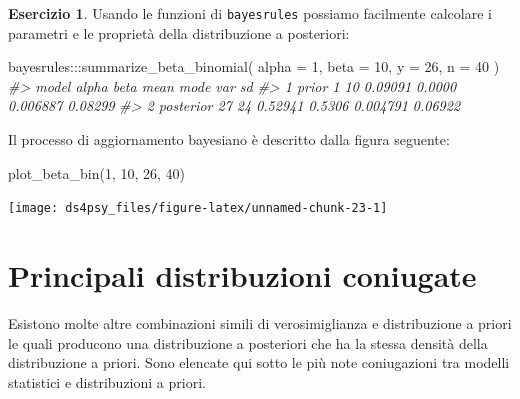 \documentclass[
  11pt,
]{krantz}
\makeatletter
\newenvironment{Shaded}{\begin{snugshade}}{\end{snugshade}}
\newcommand{\AttributeTok}[1]{\textcolor[rgb]{0.61,0.61,0.61}{#1}}
\newcommand{\CommentTok}[1]{\textcolor[rgb]{0.37,0.37,0.37}{\textit{#1}}}
\newcommand{\DecValTok}[1]{\textcolor[rgb]{0.06,0.06,0.06}{#1}}
\newcommand{\FunctionTok}[1]{\textcolor[rgb]{0,0,0}{#1}}
\newcommand{\NormalTok}[1]{#1}
\newcommand{\SpecialCharTok}[1]{\textcolor[rgb]{0,0,0}{#1}}
\newenvironment{kframe}{%
\medskip{}
\setlength{\fboxsep}{.8em}
 \def\at@end@of@kframe{}%
 \ifinner\ifhmode%
  \def\at@end@of@kframe{\end{minipage}}%
  \begin{minipage}{\columnwidth}%
 \fi\fi%
 \def\FrameCommand##1{\hskip\@totalleftmargin \hskip-\fboxsep
 \colorbox{shadecolor}{##1}\hskip-\fboxsep
     \hskip-\linewidth \hskip-\@totalleftmargin \hskip\columnwidth}%
 \MakeFramed {\advance\hsize-\width
   \@totalleftmargin\z@ \linewidth\hsize
   \@setminipage}}%
 {\par\unskip\endMakeFramed%
 \at@end@of@kframe}
\renewenvironment{Shaded}{\begin{kframe}}{\end{kframe}}
\theoremstyle{definition}
\theoremstyle{definition}
\theoremstyle{definition}
\newtheorem{exercise}{Esercizio}[chapter]
\theoremstyle{definition}
\theoremstyle{remark}
\makeatother
\begin{document}
\begin{exercise}
Usando le funzioni di \texttt{bayesrules} possiamo facilmente calcolare i parametri e le proprietà della distribuzione a posteriori:

\begin{Shaded}
\begin{Highlighting}[]
\NormalTok{bayesrules}\SpecialCharTok{:::}\FunctionTok{summarize\_beta\_binomial}\NormalTok{(}
  \AttributeTok{alpha =} \DecValTok{1}\NormalTok{, }\AttributeTok{beta =} \DecValTok{10}\NormalTok{, }\AttributeTok{y =} \DecValTok{26}\NormalTok{, }\AttributeTok{n =} \DecValTok{40}
\NormalTok{)}
\CommentTok{\#\textgreater{}       model alpha beta    mean   mode      var      sd}
\CommentTok{\#\textgreater{} 1     prior     1   10 0.09091 0.0000 0.006887 0.08299}
\CommentTok{\#\textgreater{} 2 posterior    27   24 0.52941 0.5306 0.004791 0.06922}
\end{Highlighting}
\end{Shaded}

Il processo di aggiornamento bayesiano è descritto dalla figura seguente:

\begin{Shaded}
\begin{Highlighting}[]
\FunctionTok{plot\_beta\_bin}\NormalTok{(}\DecValTok{1}\NormalTok{, }\DecValTok{10}\NormalTok{, }\DecValTok{26}\NormalTok{, }\DecValTok{40}\NormalTok{)}
\end{Highlighting}
\end{Shaded}

\begin{center}\texttt{[image: ds4psy\_files/figure-latex/unnamed-chunk-23-1]} \end{center}

\end{exercise}

\hypertarget{principali-distribuzioni-coniugate}{%
\section{Principali distribuzioni coniugate}\label{principali-distribuzioni-coniugate}}

Esistono molte altre combinazioni simili di verosimiglianza e distribuzione a priori le quali producono una distribuzione a posteriori che ha la stessa densità della distribuzione a priori. Sono elencate qui sotto le più note coniugazioni tra modelli statistici e distribuzioni a priori.
\end{document}
